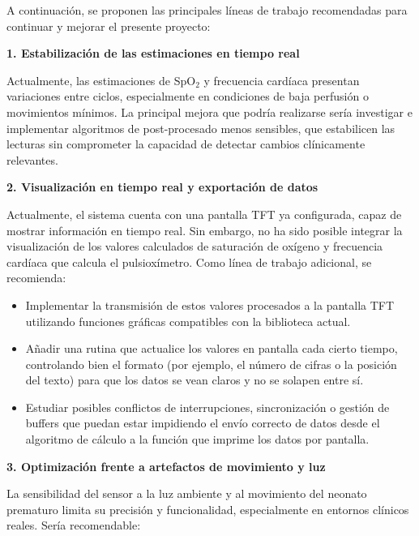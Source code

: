 
A continuación, se proponen las principales líneas de trabajo recomendadas para continuar y mejorar el presente proyecto:

\textbf{1. Estabilización de las estimaciones en tiempo real}

Actualmente, las estimaciones de SpO$_2$ y frecuencia cardíaca presentan variaciones  entre ciclos, especialmente en condiciones de baja perfusión o movimientos mínimos. La principal mejora que podría realizarse sería investigar e implementar algoritmos de post-procesado menos sensibles, que estabilicen las lecturas sin comprometer la capacidad de detectar cambios clínicamente relevantes.

\textbf{2. Visualización en tiempo real y exportación de datos}

Actualmente, el sistema cuenta con una pantalla TFT ya configurada, capaz de mostrar información en tiempo real. Sin embargo, no ha sido posible integrar la visualización de los valores calculados de saturación de oxígeno y frecuencia cardíaca que calcula el pulsioxímetro. Como línea de trabajo adicional, se recomienda:

\begin{itemize}
\item Implementar la transmisión de estos valores procesados a la pantalla TFT utilizando funciones gráficas compatibles con la biblioteca actual.
\item Añadir una rutina que actualice los valores en pantalla cada cierto tiempo, controlando bien el formato (por ejemplo, el número de cifras o la posición del texto) para que los datos se vean claros y no se solapen entre sí.
\item Estudiar posibles conflictos de interrupciones, sincronización o gestión de buffers que puedan estar impidiendo el envío correcto de datos desde el algoritmo de cálculo a la función que imprime los datos por pantalla.
\end{itemize}

\textbf{3. Optimización frente a artefactos de movimiento y luz}

La sensibilidad del sensor a la luz ambiente y al movimiento del neonato prematuro limita su precisión y funcionalidad, especialmente en entornos clínicos reales. Sería recomendable:

